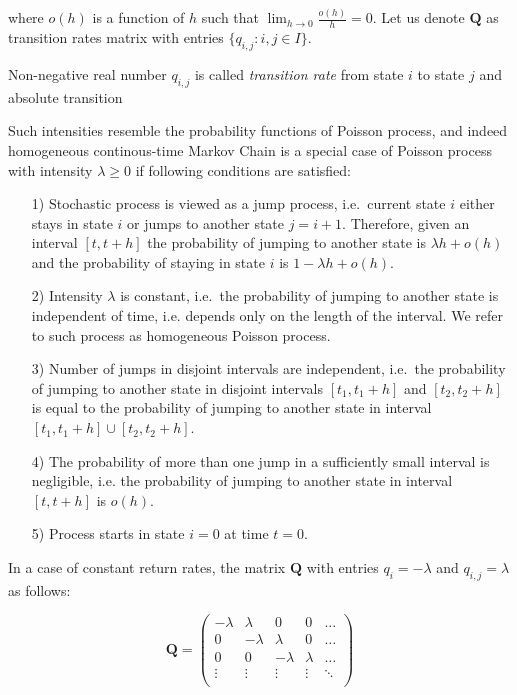 where $o(h)$ is a function of $h$ such that $\lim_{h \to 0} \frac{o(h)}{h} = 0$. Let us denote $\textbf{Q}$ as transition rates matrix with entries $\{q_{i,j}: i,j \in I\}$.

Non-negative real number $q_{i,j}$ is called {\it transition rate} from state $i$ to state $j$ and absolute transition

Such intensities resemble the probability functions of Poisson process,
 and indeed homogeneous continous-time Markov Chain is a special case of Poisson process with intensity $\lambda \geq 0$ if following conditions are satisfied:

\begin{itemize}
\item [1)] Stochastic process is viewed as a jump process, i.e.\ current state $i$ either stays in state $i$ or jumps to another state $j=i+1$. Therefore, given an interval $[t,t+h]$ the probability of jumping to another state is $\lambda h + o(h)$ and the probability of staying in state $i$ is $1-\lambda h + o(h)$.
\item [2)] Intensity $\lambda$ is constant, i.e.\ the probability of jumping to another state is independent of time, i.e. depends only on the length of the interval. We refer to such process as homogeneous Poisson process.
\item [3)] Number of jumps in disjoint intervals are independent, i.e.\ the probability of jumping to another state in disjoint intervals $[t_1,t_1+h]$ and $[t_2,t_2+h]$ is equal to the probability of jumping to another state in interval $[t_1,t_1+h] \cup [t_2,t_2+h]$.
\item [4)] The probability of more than one jump in a sufficiently small interval is negligible, i.e. the probability of jumping to another state in interval $[t,t+h]$ is $o(h)$.
\item [5)] Process starts in state $i=0$ at time $t=0$.
\end{itemize}

In a case of constant return rates, the matrix $\textbf{Q}$ with entries $q_{i} = - \lambda$ and $q_{i,j} = \lambda$ as follows:

\begin{equation}
    \textbf{Q} = 
    \begin{pmatrix}
    -\lambda & \lambda & 0 & 0 & \ldots \\
    0 & -\lambda & \lambda & 0 & \ldots \\
    0 & 0 & -\lambda & \lambda & \ldots \\
    \vdots & \vdots & \vdots & \vdots & \ddots \\
    \end{pmatrix}
\end{equation}

